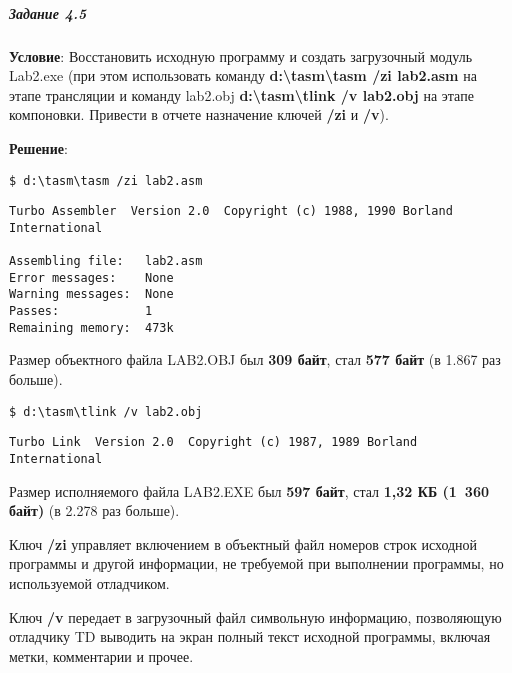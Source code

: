 \subparagraph{Задание 4.5}

\textbf{Условие}:
Восстановить исходную программу и создать загрузочный модуль Lab2.exe (при этом использовать команду \textbf{d:\textbackslash\/tasm\textbackslash\/tasm /zi lab2.asm} на этапе трансляции и команду lab2.obj \textbf{d:\textbackslash\/tasm\textbackslash\/tlink /v lab2.obj} на этапе компоновки. Привести в отчете назначение ключей \textbf{/zi} и \textbf{/v}).

\textbf{Решение}:

\begin{lstlisting}[language=Terminal]
$ d:\tasm\tasm /zi lab2.asm
\end{lstlisting}

\begin{lstlisting}[language=Out]
Turbo Assembler  Version 2.0  Copyright (c) 1988, 1990 Borland International

Assembling file:   lab2.asm
Error messages:    None
Warning messages:  None
Passes:            1
Remaining memory:  473k
\end{lstlisting}

Размер объектного файла LAB2.OBJ был \textbf{309 байт}, стал \textbf{577 байт} (в 1.867 раз больше).

\begin{lstlisting}[language=Terminal]
$ d:\tasm\tlink /v lab2.obj
\end{lstlisting}

\begin{lstlisting}[language=Out]
Turbo Link  Version 2.0  Copyright (c) 1987, 1989 Borland International
\end{lstlisting}

Размер исполняемого файла LAB2.EXE был \textbf{597 байт}, стал \textbf{1,32 КБ (1 360 байт)} (в 2.278 раз больше).

Ключ \textbf{/zi} управляет включением в объектный файл номеров строк исходной программы и другой информации, не требуемой при выполнении программы, но используемой отладчиком.

Ключ \textbf{/v} передает в загрузочный файл символьную информацию, позволяющую отладчику TD выводить на экран полный текст исходной программы, включая метки, комментарии и прочее.
